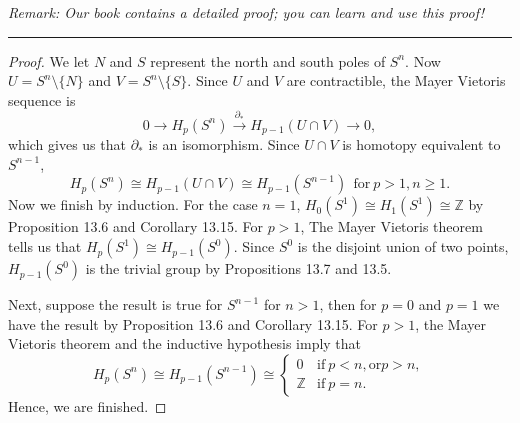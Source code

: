 \documentclass[leqno]{article}
\theoremstyle{nonumberplain}
\newtheorem{proof}{Proof}
\newcommand{\Z}{\ensuremath{\mathbb{Z}}}
\begin{document}
\emph{Remark: Our book contains a detailed proof; you can learn and use this proof!}

\noindent\rule[0.5ex]{\linewidth}{1pt}

\begin{proof}
We let $N$ and $S$ represent the north and south poles of $S^n$.  Now $U=S^n\setminus \{N\}$ and $V=S^n\setminus \{S\}$.  Since $U$ and $V$ are contractible, the Mayer Vietoris sequence is
\[
0 \to H_p(S^n)\xrightarrow{\partial_*} H_{p-1}(U\cap V) \to 0,
\]
which gives us that $\partial_*$ is an isomorphism.  Since $U\cap V$ is homotopy equivalent to $S^{n-1}$,
\[
H_p(S^n)\cong H_{p-1}(U\cap V) \cong H_{p-1}(S^{n-1}) ~~ \textrm{for} ~p>1, n\geq 1.
\]
Now we finish by induction.  For the case $n=1$, $H_0(S^1)\cong H_1(S^1)\cong \Z$ by Proposition 13.6 and Corollary 13.15. For $p>1$, The Mayer Vietoris theorem tells us that $H_p(S^1)\cong H_{p-1}(S^0)$. Since $S^0$ is the disjoint union of two points, $H_{p-1}(S^0)$ is the trivial group by Propositions 13.7 and 13.5.

Next, suppose the result is true for $S^{n-1}$ for $n>1$, then for $p=0$ and $p=1$ we have the result by Proposition 13.6 and Corollary 13.15. For $p>1$, the Mayer Vietoris theorem and the inductive hypothesis imply that
\[
H_p(S^n)\cong H_{p-1}(S^{n-1})\cong 
\begin{cases}
0 & \textrm{if}~ p<n, \textrm{or} p>n,\\
\Z & \textrm{if}~ p=n.
\end{cases}
\]
Hence, we are finished.
\end{proof}
\end{document}
